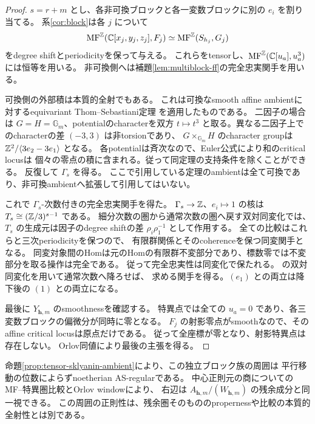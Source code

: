 \begin{proof}
 \(s=r+m\) とし、各非可換ブロックと各一変数ブロックに別の \(e_i\) を割り当てる。
 系\ref{cor:block}は各 \(j\) について
 \[
 \operatorname{MF}^{\mathbb Z}(\mathbb C[x_j,y_j,z_j],F_j)
 \simeq\operatorname{MF}^{\mathbb Z}(S_{h_j},G_j)
 \]
 をdegree shiftとperiodicityを保って与える。
 これらをtensorし、\(\operatorname{MF}^{\mathbb Z}(\mathbb C[u_a],u_a^3)\) には恒等を用いる。
 非可換側へは補題\ref{lem:multiblock-ff}の完全忠実関手を用いる。

 可換側の外部積は本質的全射でもある。
 これは可換なsmooth affine ambientに対するequivariant Thom--Sebastiani定理
 \cite[Theorem 5.15, Corollary 5.18]{BFK}を適用したものである。
 二因子の場合は \(G=H=\mathbb G_m\)、potentialのcharacterを双方 \(t\mapsto t^3\)
 と取る。異なる二因子上でのcharacterの差 \((-3,3)\) は非torsionであり、
 \(G\times_{\mathbb G_m}H\) のcharacter groupは
 \(\mathbb Z^2/\langle3e_2-3e_1\rangle\) となる。
 各potentialは斉次なので、Euler公式により和のcritical locusは
 個々の零点の積に含まれる。従って同定理の支持条件を除くことができる。
 反復して \(\Gamma_s\) を得る。
 ここで引用している定理のambientは全て可換であり、非可換ambientへ拡張して引用してはいない。

 これで \(\Gamma_s\)-次数付きの完全忠実関手を得た。
 \(\Gamma_s\to\mathbb Z\)、\(e_i\mapsto1\) の核は
 \(T_s\cong(\mathbb Z/3)^{s-1}\) である。
 細分次数の圏から通常次数の圏へ戻す双対同変化では、
 \(T_s\) の生成元は因子のdegree shiftの差
 \(\rho_i\rho_1^{-1}\) として作用する。
 全ての比較はこれらと三次periodicityを保つので、
 有限群関係とそのcoherenceを保つ同変関手となる。
 同変対象間のHomは元のHomの有限群不変部分であり、標数零では不変部分を取る操作は完全である。
 従って完全忠実性は同変化で保たれる。
 \cite[Theorem 4.2 and Section 8]{Elagin}の双対同変化を用いて通常次数へ降ろせば、
 求める関手を得る。\((e_1)\) との両立は降下後の \((1)\) との両立になる。

 最後に \(Y_{\mathbf h,m}\) のsmoothnessを確認する。
 特異点では全ての \(u_a=0\) であり、各三変数ブロックの偏微分が同時に零となる。
 \(F_j\) の射影零点がsmoothなので、そのaffine critical locusは原点だけである。
 従って全座標が零となり、射影特異点は存在しない。
 Orlov同値により最後の主張を得る。
\end{proof}

\begin{remark}
 命題\ref{prop:tensor-sklyanin-ambient}により、この独立ブロック族の周囲は
 平行移動の位数によらずnoetherian AS-regularである。
 中心正則元の商についてのMF--特異圏比較とOrlov windowにより、
 右辺は \(A_{\mathbf h,m}/(W_{\mathbf h,m})\) の残余成分と同一視できる。
 この周囲の正則性は、残余圏そのもののpropernessや比較の本質的全射性とは別である。
\end{remark}

